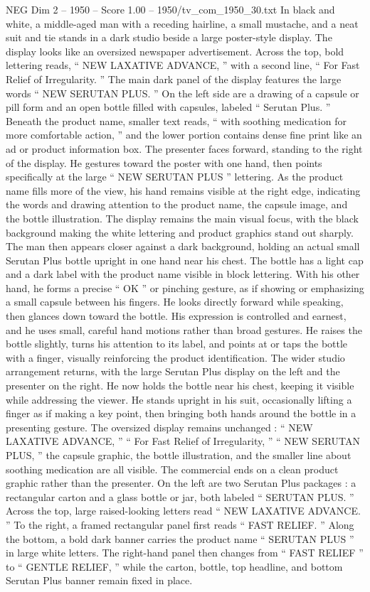 \begin{textsample}{NEG Dim 2 – 1950 – Score 1.00 – 1950/tv\_com\_1950\_30.txt}  \label{ex:f2_neg_009}
In black and white, a middle-aged man with a receding hairline, a small mustache, and a neat suit and tie stands in a dark studio beside a large poster-style display.
The display looks like an oversized newspaper advertisement.
Across the top, bold lettering reads, “ NEW LAXATIVE ADVANCE, ” with a second line, “ For Fast Relief of Irregularity. ” The main dark panel of the display features the large words “ NEW SERUTAN PLUS. ” On the left side are a drawing of a capsule or pill form and an open bottle filled with capsules, labeled “ Serutan Plus. ” Beneath the product name, smaller text reads, “ with soothing medication for more comfortable action, ” and the lower portion contains dense fine print like an ad or product information box.
The presenter faces forward, standing to the right of the display.
He gestures toward the poster with one hand, then points specifically at the large “ NEW SERUTAN PLUS ” lettering.
As the product name fills more of the view, his hand remains visible at the right edge, indicating the words and drawing attention to the product name, the capsule image, and the bottle illustration.
The display remains the main visual focus, with the black background making the white lettering and product graphics stand out sharply.
The man then appears closer against a dark background, holding an actual small Serutan Plus bottle upright in one hand near his chest.
The bottle has a light cap and a dark label with the product name visible in block lettering.
With his other hand, he forms a precise “ OK ” or pinching gesture, as if showing or emphasizing a small capsule between his fingers.
He looks directly forward while speaking, then glances down toward the bottle.
His expression is controlled and earnest, and he uses small, careful hand motions rather than broad gestures.
He raises the bottle slightly, turns his attention to its label, and points at or taps the bottle with a finger, visually reinforcing the product identification.
The wider studio arrangement returns, with the large Serutan Plus display on the left and the presenter on the right.
He now holds the bottle near his chest, keeping it visible while addressing the viewer.
He stands upright in his suit, occasionally lifting a finger as if making a key point, then bringing both hands around the bottle in a presenting gesture.
The oversized display remains unchanged : “ NEW LAXATIVE ADVANCE, ” “ For Fast Relief of Irregularity, ” “ NEW SERUTAN PLUS, ” the capsule graphic, the bottle illustration, and the smaller line about soothing medication are all visible.
The commercial ends on a clean product graphic rather than the presenter.
On the left are two Serutan Plus packages : a rectangular carton and a glass bottle or jar, both labeled “ SERUTAN PLUS. ” Across the top, large raised-looking letters read “ NEW LAXATIVE ADVANCE. ” To the right, a framed rectangular panel first reads “ FAST RELIEF. ” Along the bottom, a bold dark banner carries the product name “ SERUTAN PLUS ” in large white letters.
The right-hand panel then changes from “ FAST RELIEF ” to “ GENTLE RELIEF, ” while the carton, bottle, top headline, and bottom Serutan Plus banner remain fixed in place.

\end{textsample}
